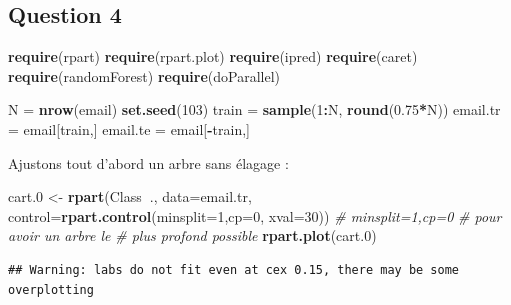 \documentclass[]{article}
\newenvironment{Shaded}{\begin{snugshade}}{\end{snugshade}}
\newcommand{\CommentTok}[1]{\textcolor[rgb]{0.56,0.35,0.01}{\textit{#1}}}
\newcommand{\DataTypeTok}[1]{\textcolor[rgb]{0.13,0.29,0.53}{#1}}
\newcommand{\DecValTok}[1]{\textcolor[rgb]{0.00,0.00,0.81}{#1}}
\newcommand{\FloatTok}[1]{\textcolor[rgb]{0.00,0.00,0.81}{#1}}
\newcommand{\KeywordTok}[1]{\textcolor[rgb]{0.13,0.29,0.53}{\textbf{#1}}}
\newcommand{\NormalTok}[1]{#1}
\newcommand{\OperatorTok}[1]{\textcolor[rgb]{0.81,0.36,0.00}{\textbf{#1}}}
\newcommand{\StringTok}[1]{\textcolor[rgb]{0.31,0.60,0.02}{#1}}
\begin{document}
\hypertarget{question-4}{%
\subsection{Question 4}\label{question-4}}

\begin{Shaded}
\begin{Highlighting}[]
\KeywordTok{require}\NormalTok{(rpart)}
\KeywordTok{require}\NormalTok{(rpart.plot)}
\KeywordTok{require}\NormalTok{(ipred)}
\KeywordTok{require}\NormalTok{(caret)}
\KeywordTok{require}\NormalTok{(randomForest)}
\KeywordTok{require}\NormalTok{(doParallel)}
\end{Highlighting}
\end{Shaded}

\begin{Shaded}
\begin{Highlighting}[]
\NormalTok{N =}\StringTok{ }\KeywordTok{nrow}\NormalTok{(email)}
\KeywordTok{set.seed}\NormalTok{(}\DecValTok{103}\NormalTok{)}
\NormalTok{train =}\StringTok{ }\KeywordTok{sample}\NormalTok{(}\DecValTok{1}\OperatorTok{:}\NormalTok{N, }\KeywordTok{round}\NormalTok{(}\FloatTok{0.75}\OperatorTok{*}\NormalTok{N))}
\NormalTok{email.tr =}\StringTok{ }\NormalTok{email[train,]}
\NormalTok{email.te =}\StringTok{ }\NormalTok{email[}\OperatorTok{-}\NormalTok{train,]}
\end{Highlighting}
\end{Shaded}

Ajustons tout d'abord un arbre sans élagage :

\begin{Shaded}
\begin{Highlighting}[]
\NormalTok{cart}\FloatTok{.0}\NormalTok{ <-}\StringTok{ }\KeywordTok{rpart}\NormalTok{(Class}\OperatorTok{~}\NormalTok{.,}
                \DataTypeTok{data=}\NormalTok{email.tr, }
                \DataTypeTok{control=}\KeywordTok{rpart.control}\NormalTok{(}\DataTypeTok{minsplit=}\DecValTok{1}\NormalTok{,}\DataTypeTok{cp=}\DecValTok{0}\NormalTok{, }\DataTypeTok{xval=}\DecValTok{30}\NormalTok{)) }\CommentTok{# minsplit=1,cp=0}
                                                                \CommentTok{# pour avoir un arbre le}
                                                                \CommentTok{# plus profond possible}
\KeywordTok{rpart.plot}\NormalTok{(cart}\FloatTok{.0}\NormalTok{)}
\end{Highlighting}
\end{Shaded}

\begin{verbatim}
## Warning: labs do not fit even at cex 0.15, there may be some overplotting
\end{verbatim}
\end{document}
